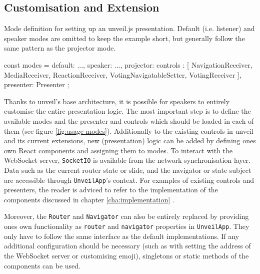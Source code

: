 \subsection{Customisation and Extension}
\label{sec:usage-customisation}

\begin{program}
\caption{Mode definition for setting up an unveil.js presentation. Default (i.e. listener) and speaker modes are omitted to keep the example short, but generally follow the same pattern as the projector mode.}
\label{fig:usage-modes}
\begin{JsCode}
const modes = {
  default: {...},
  speaker: {...},
  projector: {
    controls : [
      NavigationReceiver, MediaReceiver, ReactionReceiver,
      VotingNavigatableSetter, VotingReceiver
    ],
    presenter: Presenter
  }
};
\end{JsCode}
\end{program}

Thanks to unveil's base architecture, it is possible for speakers to entirely customise the entire presentation logic. The most important step is to define the available modes and the presenter and controls which should be loaded in each of them (see figure \ref{fig:usage-modes}). Additionally to the existing controls in unveil and its current extensions, new (presentation) logic can be added by defining ones own React components and assigning them to modes. To interact with the WebSocket server, \texttt{SocketIO} is available from the network synchronisation layer. Data such as the current router state or slide, and the navigator or state subject are accessible through \texttt{UnveilApp}'s context. For examples of existing controls and presenters, the reader is adviced to refer to the implementation of the components discussed in chapter \ref{cha:implementation} \cite{unveil-fork, unveil-network-sync, unveil-interactive}.

Moreover, the \texttt{Router} and \texttt{Navigator} can also be entirely replaced by providing ones own functionality as \texttt{router} and \texttt{navigator} properties in \texttt{UnveilApp}. They only have to follow the same interface as the default implementations. If any additional configuration should be necessary (such as with setting the address of the WebSocket server or customising emoji), singletons or static methods of the components can be used.
